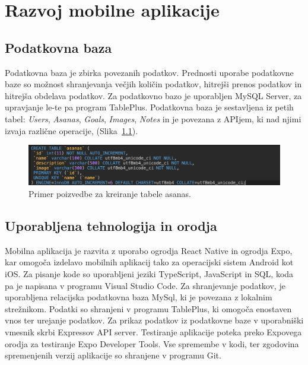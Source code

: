 \documentclass[a4paper, 12pt]{book}
\begin{document}
\chapter{Razvoj mobilne aplikacije}

\section{Podatkovna baza}
Podatkovna baza je zbirka povezanih podatkov. Prednosti uporabe podatkovne baze so možnost shranjevanja večjih količin podatkov, hitrejši prenos podatkov in hitrejša obdelava podatkov. Za podatkovno bazo je uporabljen MySQL Server, za upravjanje le-te pa program TablePlus. Podatkovna baza je sestavljena iz petih tabel: \textit{Users}, \textit{Asanas}, \textit{Goals}, \textit{Images}, \textit{Notes} in je povezana z APIjem, ki nad njimi izvaja različne operacije, (Slika~\ref{query}).

\begin{figure}[htbp]
\begin{center}
\includegraphics[scale=.55]{query.jpg}
\end{center}
\caption{Primer poizvedbe za kreiranje tabele asanas.}
\label{query}
\end{figure}


\section{Uporabljena tehnologija in orodja}

Mobilna aplikacija je razvita z uporabo ogrodja React Native in ogrodja Expo, kar omogoča izdelavo mobilnih aplikacij tako za operacijski sistem Android kot iOS. Za pisanje kode so uporabljeni jeziki TypeScript, JavaScript in SQL, koda pa je napisana v programu Visual Studio Code. Za shranjevanje podatkov, je uporabljena relacijska podatkovna baza MySql, ki je povezana z lokalnim strežnikom. Podatki so shranjeni v programu TablePlus, ki omogoča enostaven vnos ter urejanje podatkov. Za prikaz podatkov iz podatkovne baze v uporabniški vmesnik skrbi Expressov API server.
Testiranje aplikacije poteka preko Expovega orodja za testiranje Expo Developer Tools. Vse spremembe v kodi, ter zgodovina spremenjenih verzij aplikacije so shranjene v programu Git.
\end{document}
